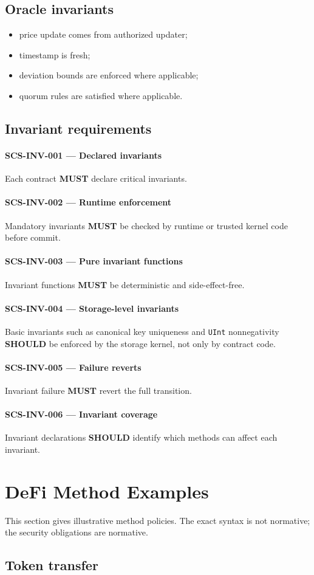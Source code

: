\documentclass[11pt]{article}
\newcommand{\MUST}{\textbf{MUST}}
\newcommand{\SHOULD}{\textbf{SHOULD}}
\newcommand{\req}[2]{\paragraph{#1}#2\par}
\newcommand{\code}[1]{\texttt{#1}}
\begin{document}
\subsection{Oracle invariants}

\begin{itemize}
  \item price update comes from authorized updater;
  \item timestamp is fresh;
  \item deviation bounds are enforced where applicable;
  \item quorum rules are satisfied where applicable.
\end{itemize}

\subsection{Invariant requirements}

\req{SCS-INV-001 --- Declared invariants}{Each contract \MUST{} declare critical invariants.}

\req{SCS-INV-002 --- Runtime enforcement}{Mandatory invariants \MUST{} be checked by runtime or trusted kernel code before commit.}

\req{SCS-INV-003 --- Pure invariant functions}{Invariant functions \MUST{} be deterministic and side-effect-free.}

\req{SCS-INV-004 --- Storage-level invariants}{Basic invariants such as canonical key uniqueness and \code{UInt} nonnegativity \SHOULD{} be enforced by the storage kernel, not only by contract code.}

\req{SCS-INV-005 --- Failure reverts}{Invariant failure \MUST{} revert the full transition.}

\req{SCS-INV-006 --- Invariant coverage}{Invariant declarations \SHOULD{} identify which methods can affect each invariant.}



\section{DeFi Method Examples}

This section gives illustrative method policies. The exact syntax is not normative; the security obligations are normative.

\subsection{Token transfer}
\end{document}
